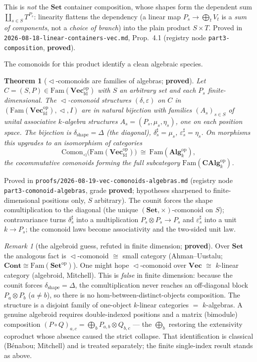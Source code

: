 \documentclass[11pt]{article}
\theoremstyle{plain}
\newtheorem{theorem}{Theorem}
\theoremstyle{definition}
\theoremstyle{remark}
\newtheorem{remark}{Remark}
\newcommand{\Set}{\mathbf{Set}}
\newcommand{\Vect}{\mathbf{Vec}}
\newcommand{\Vecfd}{\mathbf{Vec}_{\mathrm{fd}}}
\newcommand{\Fam}{\mathrm{Fam}}
\newcommand{\Cont}{\mathbf{Cont}}
\newcommand{\Alg}{\mathbf{Alg}}
\renewcommand{\lhd}{\vartriangleleft}
\newcommand{\op}{\mathrm{op}}
\begin{document}
\noindent This is \emph{not} the $\Set$ container composition, whose shapes form the dependent sum
$\coprod_{s\in S}T^{P_s}$: linearity flattens the dependency (a linear map $P_s\to\bigoplus_t V_t$ is
a \emph{sum of components}, not a \emph{choice of branch}) into the plain product $S\times T$.
Proved in \texttt{2026-08-18-linear-containers-vec.md}, Prop.~4.1 (registry node
\texttt{part3-composition}, \textbf{proved}).

The comonoids for this product identify a clean algebraic species.

\begin{theorem}[$\lhd$-comonoids are families of algebras; \textbf{proved}]
\label{thm:comonoid}
Let $C=(S,P)\in\Fam(\Vecfd^\op)$ with $S$ an arbitrary set and each $P_s$ finite-dimensional. The
$\lhd$-comonoid structures $(\delta,\varepsilon)$ on $C$ in $(\Fam(\Vecfd^\op),\lhd,I)$ are in
natural bijection with families $(A_s)_{s\in S}$ of unital associative $k$-algebra structures
$A_s=(P_s,\mu_s,\eta_s)$, one on each position space. The bijection is
$\delta_{\mathrm{shape}}=\Delta$ (the diagonal), $\delta^\sharp_s=\mu_s$,
$\varepsilon^\sharp_s=\eta_s$. On morphisms this upgrades to an isomorphism of categories
\[
   \mathrm{Comon}_\lhd\bigl(\Fam(\Vecfd^\op)\bigr)\ \cong\ \Fam(\Alg_k^\op),
\]
the cocommutative comonoids forming the full subcategory $\Fam(\mathbf{CAlg}_k^\op)$.
\end{theorem}

\noindent Proved in \texttt{proofs/2026-08-19-vec-comonoids-algebras.md} (registry node
\texttt{part3-comonoid-algebras}, grade \textbf{proved}; hypotheses sharpened to
finite-dimensional positions only, $S$ arbitrary). The counit forces the shape comultiplication to
the diagonal (the unique $(\Set,\times)$-comonoid on $S$); contravariance turns $\delta^\sharp_s$
into a multiplication $P_s\otimes P_s\to P_s$ and $\varepsilon^\sharp_s$ into a unit $k\to P_s$;
the comonoid laws become associativity and the two-sided unit law.

\begin{remark}[the algebroid guess, refuted in finite dimension; \textbf{proved}]
Over $\Set$ the analogous fact is $\lhd$-comonoid $\cong$ small category (Ahman--Uustalu; $\Cont\cong
\Fam(\Set^\op)$). One might hope $\lhd$-comonoid over $\Vect$ $\cong$ $k$-linear category (algebroid,
Mitchell). This is \emph{false} in finite dimension: because the counit forces
$\delta_{\mathrm{shape}}=\Delta$, the comultiplication never reaches an off-diagonal block
$P_a\otimes P_b$ ($a\neq b$), so there is no hom-between-distinct-objects composition. The structure
is a disjoint family of one-object $k$-linear categories $=$ $k$-algebras. A genuine algebroid
requires double-indexed positions and a matrix (bimodule) composition
$(P\circ Q)_{a,c}=\bigoplus_b P_{a,b}\otimes Q_{b,c}$ --- the $\bigoplus_b$ restoring the extensivity
coproduct whose absence caused the strict collapse. That identification is classical
(B\'enabou; Mitchell) and is treated separately; the finite single-index result stands as above.
\end{remark}
\end{document}
